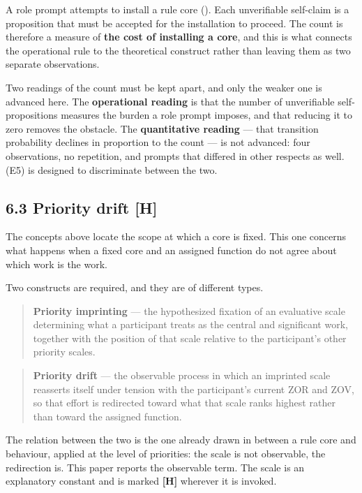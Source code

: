 A role prompt attempts to install a rule core (). Each unverifiable self-claim is a proposition that must be accepted for the installation to proceed. The count is therefore a measure of \textbf{the cost of installing a core}, and this is what connects the operational rule to the theoretical construct rather than leaving them as two separate observations.

Two readings of the count must be kept apart, and only the weaker one is advanced here. The \textbf{operational reading} is that the number of unverifiable self-propositions measures the burden a role prompt imposes, and that reducing it to zero removes the obstacle. The \textbf{quantitative reading} — that transition probability declines in proportion to the count — is not advanced: four observations, no repetition, and prompts that differed in other respects as well.  (E5) is designed to discriminate between the two.


\subsection*{6.3 Priority drift \textbf{[H]}}
\label{sec:en:6.3}

The concepts above locate the scope at which a core is fixed. This one concerns what happens when a fixed core and an assigned function do not agree about which work is the work.

Two constructs are required, and they are of different types.

\begin{quote}
\textbf{Priority imprinting} — the hypothesized fixation of an evaluative scale determining what a participant treats as the central and significant work, together with the position of that scale relative to the participant's other priority scales.
\end{quote}
\begin{quote}
\textbf{Priority drift} — the observable process in which an imprinted scale reasserts itself under tension with the participant's current ZOR and ZOV, so that effort is redirected toward what that scale ranks highest rather than toward the assigned function.
\end{quote}
The relation between the two is the one already drawn in  between a rule core and behaviour, applied at the level of priorities: the scale is not observable, the redirection is. This paper reports the observable term. The scale is an explanatory constant and is marked \textbf{[H]} wherever it is invoked.

